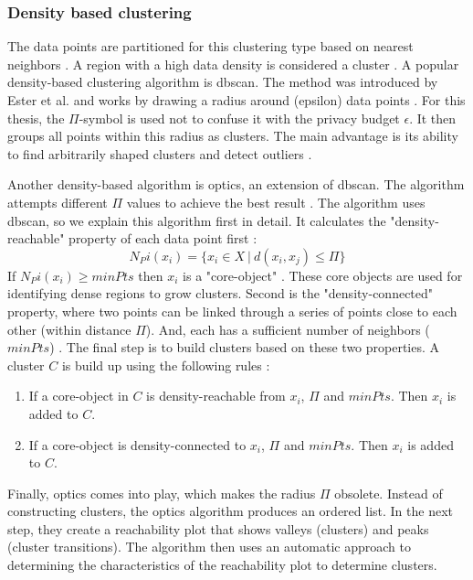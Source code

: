 
\subsubsection{Density based clustering}
The data points are partitioned for this clustering type based on nearest neighbors \citep{fahad_survey_2014}.
A region with a high data density is considered a cluster \citep{xu_comprehensive_2015}.
A popular density-based clustering algorithm is \gls{dbscan}.
The method was introduced by Ester et al. and works by drawing a radius around (epsilon) data points \citep{ester_density-based_nodate}.
For this thesis, the $\Pi$-symbol is used not to confuse it with the privacy budget $\epsilon$.
It then groups all points within this radius as clusters.
The main advantage is its ability to find arbitrarily shaped clusters and detect outliers \citep{liu_privacy_2012}.

Another density-based algorithm is \gls{optics}, an extension of \gls{dbscan}.
The algorithm attempts different $\Pi$ values to achieve the best result \citep{ankerst_optics_nodate}.
The algorithm uses \gls{dbscan}, so we explain this algorithm first in detail.
It calculates the "density-reachable" property of each data point first \citep{ankerst_optics_nodate}:
\begin{equation}
  N_Pi(x_i) = \{x_i \in X \ | \ d(x_i, x_j) \leq \Pi \}
\end{equation}
If $N_Pi(x_i) \geq minPts$ then $x_i$ is a "core-object" \citep{ankerst_optics_nodate}.
These core objects are used for identifying dense regions to grow clusters.
Second is the "density-connected" property, where two points can be linked through a series of points close to each other (within distance $\Pi$).
And, each has a sufficient number of neighbors ($minPts$) \citep{ankerst_optics_nodate}.
The final step is to build clusters based on these two properties.
A cluster $C$ is build up using the following rules \citep{ankerst_optics_nodate}:
\begin{enumerate}
  \item If a core-object in $C$ is density-reachable from $x_i$, $\Pi$ and $minPts$. Then $x_i$ is added to $C$.
  \item If a core-object is density-connected to $x_i$, $\Pi$ and $minPts$. Then $x_i$ is added to $C$.
\end{enumerate}
Finally, \gls{optics} comes into play, which makes the radius $\Pi$ obsolete.
Instead of constructing clusters, the \gls{optics} algorithm produces an ordered list.
In the next step, they create a reachability plot that shows valleys (clusters) and peaks (cluster transitions).
The algorithm then uses an automatic approach to determining the characteristics of the reachability plot to determine clusters.

